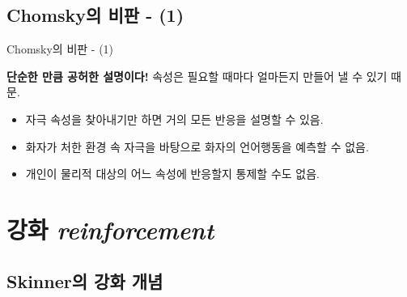 \documentclass[aspectratio=169]{beamer}
\begin{document}
\subsection{Chomsky의 비판 - (1)}

\begin{frame}{Chomsky의 비판 - (1)}
    \begin{alertblock}{\textbf{단순한 만큼 공허한 설명이다!}}
    \medskip 속성은 필요할 때마다 얼마든지 만들어 낼 수 있기 때문.
    \end{alertblock}
    \bigskip
    \begin{itemize}
        \item 자극 속성을 찾아내기만 하면 거의 모든 반응을 설명할 수 있음.
        \item 화자가 처한 환경 속 자극을 바탕으로 화자의 언어행동을 예측할 수 없음.
        \item 개인이 물리적 대상의 어느 속성에 반응할지 통제할 수도 없음.
    \end{itemize}
\end{frame}

\section{강화 \textit{reinforcement}}
\subsection{Skinner의 강화 개념}
\end{document}
